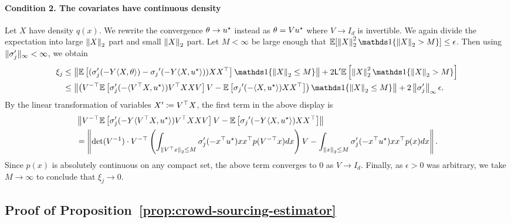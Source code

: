\paragraph{Condition 2. The covariates have continuous density}
Let $X$ have density $q(x)$. We rewrite the convergence
$\theta \to u^\star$ instead as $\theta
= V u^\star$ where $V \to I_d$ is invertible. We again divide the expectation
into large $\left\|{X}\right\|_2$ part and small $\left\|{X}\right\|_2$ part. Let
$M < \infty$ be large enough that $\E[\ltwo{X}^2 \ind\{\ltwo{X} > M\}]
\le \epsilon$. Then using $\|{\sigma_j'}\|_\infty < \infty$,
we obtain
\begin{align*}
  \xi_j & \leq \norm{\E\left[(\sigma_j'(-Y\<X, \theta\>) -{\sigma_j}'(-Y\<X, u\opt\>)) XX^\top \right] \ind \{\ltwo{X} \leq M\}} + 2 \lipconst'
  \Ep \brk{\ltwo{X}^2 \ind \{\ltwo{X} > M\}} \nonumber \\
  & \le \norm{ \prn{V^{-\top} \E\left[\sigma_j'(-\<V^\top X, u\opt\>) V^\top X XV \right] V - \E\left[{\sigma_j}'(-\<X, u\opt\>)XX^\top \right]}  \ind \{\ltwo{X} \leq M\}}  + 2 \linf{\sigma_j'} \epsilon.
\end{align*}
By the linear transformation of variables $X' \coloneqq V^\top X$, the first
term in the above display is
\begin{align*}
	&\left\|{ V^{-\top} \mathbb{E}\left[\sigma_j'(-Y\langle V^\top X, u^\star\rangle) V^\top X XV \right] V - \mathbb{E}\left[{\sigma_j}'(-Y\langle X, u^\star\rangle)XX^\top \right]}\right\| \nonumber \\
	&= \left\|{\det(V^{-1}) \cdot V^{-\top} \left({\int_{\left\|{V^\top x}\right\|_2 \leq M} \sigma_j'(-x^\top u^\star) xx^\top p(V^{-\top} x) dx}\right)  V - \int_{\left\|{x}\right\|_2 \leq M} \sigma_j'(-x^\top u^\star) xx^\top p(x) dx}\right\|.
\end{align*}
Since $p(x)$ is absolutely continuous on any compact set, the above term
converges to $0$ as $V \to I_d$. Finally, as $\epsilon > 0$ was arbitrary,
we take $M \to \infty$ to conclude that $\xi_j \to 0$.

\subsection{Proof of Proposition~\ref{prop:crowd-sourcing-estimator}} \label{proof:crowd-sourcing-estimator}

